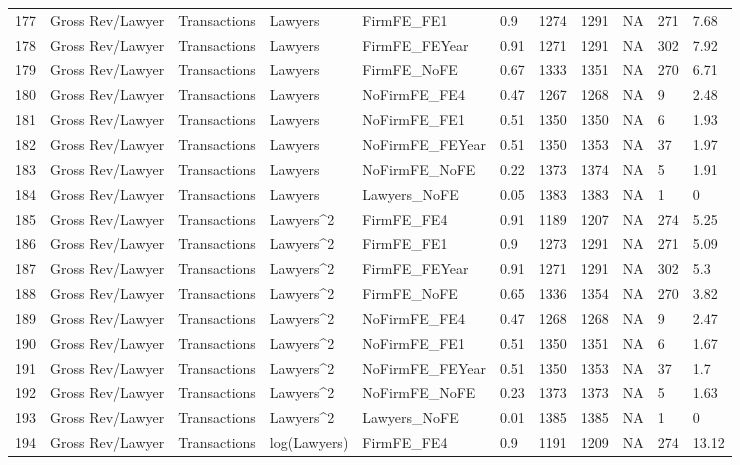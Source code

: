 \documentclass{article}
\begin{document}
\begin{table}[H]
\begin{tabular}{rllllllllll}
  177 & Gross Rev/Lawyer & Transactions & Lawyers & FirmFE\_FE1 & 0.9 & 1274 & 1291 & NA & 271 & 7.68 \\ 
  178 & Gross Rev/Lawyer & Transactions & Lawyers & FirmFE\_FEYear & 0.91 & 1271 & 1291 & NA & 302 & 7.92 \\ 
  179 & Gross Rev/Lawyer & Transactions & Lawyers & FirmFE\_NoFE & 0.67 & 1333 & 1351 & NA & 270 & 6.71 \\ 
  180 & Gross Rev/Lawyer & Transactions & Lawyers & NoFirmFE\_FE4 & 0.47 & 1267 & 1268 & NA & 9 & 2.48 \\ 
  181 & Gross Rev/Lawyer & Transactions & Lawyers & NoFirmFE\_FE1 & 0.51 & 1350 & 1350 & NA & 6 & 1.93 \\ 
  182 & Gross Rev/Lawyer & Transactions & Lawyers & NoFirmFE\_FEYear & 0.51 & 1350 & 1353 & NA & 37 & 1.97 \\ 
  183 & Gross Rev/Lawyer & Transactions & Lawyers & NoFirmFE\_NoFE & 0.22 & 1373 & 1374 & NA & 5 & 1.91 \\ 
  184 & Gross Rev/Lawyer & Transactions & Lawyers & Lawyers\_NoFE & 0.05 & 1383 & 1383 & NA & 1 & 0 \\ 
  185 & Gross Rev/Lawyer & Transactions & Lawyers^2 & FirmFE\_FE4 & 0.91 & 1189 & 1207 & NA & 274 & 5.25 \\ 
  186 & Gross Rev/Lawyer & Transactions & Lawyers^2 & FirmFE\_FE1 & 0.9 & 1273 & 1291 & NA & 271 & 5.09 \\ 
  187 & Gross Rev/Lawyer & Transactions & Lawyers^2 & FirmFE\_FEYear & 0.91 & 1271 & 1291 & NA & 302 & 5.3 \\ 
  188 & Gross Rev/Lawyer & Transactions & Lawyers^2 & FirmFE\_NoFE & 0.65 & 1336 & 1354 & NA & 270 & 3.82 \\ 
  189 & Gross Rev/Lawyer & Transactions & Lawyers^2 & NoFirmFE\_FE4 & 0.47 & 1268 & 1268 & NA & 9 & 2.47 \\ 
  190 & Gross Rev/Lawyer & Transactions & Lawyers^2 & NoFirmFE\_FE1 & 0.51 & 1350 & 1351 & NA & 6 & 1.67 \\ 
  191 & Gross Rev/Lawyer & Transactions & Lawyers^2 & NoFirmFE\_FEYear & 0.51 & 1350 & 1353 & NA & 37 & 1.7 \\ 
  192 & Gross Rev/Lawyer & Transactions & Lawyers^2 & NoFirmFE\_NoFE & 0.23 & 1373 & 1373 & NA & 5 & 1.63 \\ 
  193 & Gross Rev/Lawyer & Transactions & Lawyers^2 & Lawyers\_NoFE & 0.01 & 1385 & 1385 & NA & 1 & 0 \\ 
  194 & Gross Rev/Lawyer & Transactions & log(Lawyers) & FirmFE\_FE4 & 0.9 & 1191 & 1209 & NA & 274 & 13.12 \\ 

\end{tabular}
\end{table}
\end{document}
